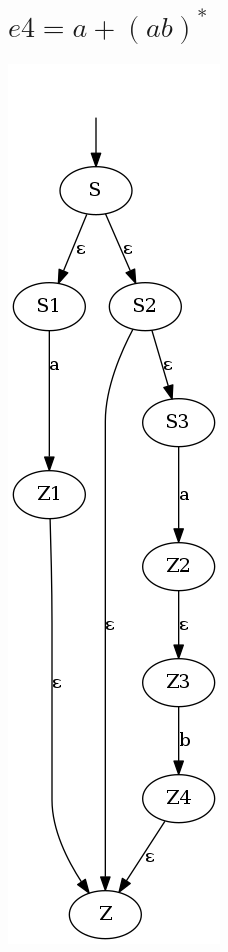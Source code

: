 \documentclass{article}
\begin{document}
\section{$e4 = a + (a b)^{*} $}
\includegraphics[scale=0.5]{e4.png}
\end{document}
